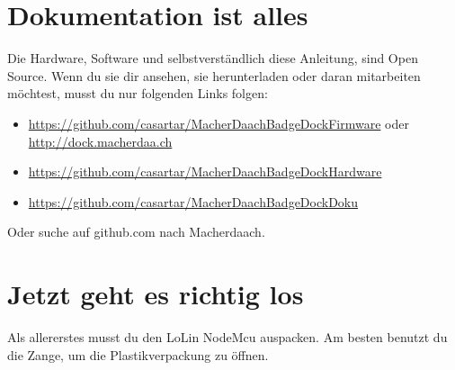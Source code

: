 \documentclass{article}
\begin{document}
\section{Dokumentation ist alles}

Die Hardware, Software und selbstverständlich diese Anleitung, sind Open Source. Wenn du sie dir ansehen, sie herunterladen oder daran mitarbeiten möchtest, musst du nur folgenden Links folgen:

\begin{itemize}
	\item \url{https://github.com/casartar/MacherDaachBadgeDockFirmware} oder \url{http://dock.macherdaa.ch}
	\item \url{https://github.com/casartar/MacherDaachBadgeDockHardware}
	\item \url{https://github.com/casartar/MacherDaachBadgeDockDoku}
\end{itemize}

Oder suche auf github.com nach Macherdaach.

\section{Jetzt geht es richtig los}
Als allererstes musst du den LoLin NodeMcu auspacken. Am besten benutzt du die Zange, um die Plastikverpackung zu öffnen.

\vspace{1cm}
\end{document}
